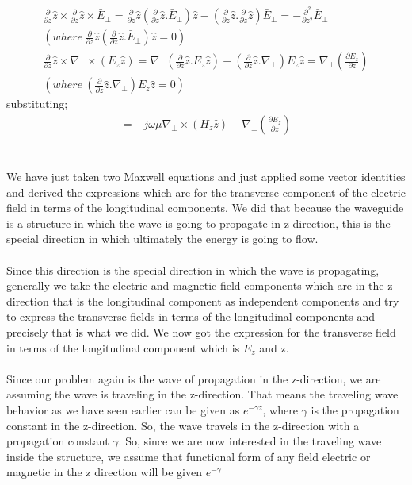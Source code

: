 \begin{align*}
\frac{\partial}{\partial z}\hat{z}\times\frac{\partial}{\partial z}\hat{z}\times\bar{E}_\bot = \frac{\partial}{\partial z}\hat{z}(\frac{\partial}{\partial z}\hat{z}.\bar{E}_\bot)\hat{z} - (\frac{\partial}{\partial z}\hat{z}.\frac{\partial}{\partial z}\hat{z})\bar{E}_\bot = -\frac{\partial^2}{\partial z^2}\bar{E}_\bot\\
(where\ \frac{\partial}{\partial z}\hat{z}(\frac{\partial}{\partial z}\hat{z}.\bar{E}_\bot)\hat{z} = 0)\\
\frac{\partial}{\partial z}\hat{z}\times\nabla_\bot\times(E_z\hat{z}) = \nabla_\bot(\frac{\partial}{\partial z}\hat{z}.E_z\hat{z}) - (\frac{\partial}{\partial z}\hat{z}.\nabla_\bot)E_z\hat{z} = \nabla_\bot(\frac{\partial E_z}{\partial z})\\
(where\ (\frac{\partial}{\partial z}\hat{z}.\nabla_\bot)E_z\hat{z} = 0)
\end{align*}
substituting;
\begin{align}
[\omega^2\mu\epsilon\bar{E}_\bot+\frac{\partial^2}{\partial z^2}\bar{E}_\bot] = -j\omega\mu\nabla_\bot\times(H_z\hat{z}) + \nabla_\bot(\frac{\partial E_z}{\partial z})
\end{align}\\
\\
We have just taken two Maxwell equations and just applied some vector identities and derived the expressions which are for the transverse component of the electric field in terms of the longitudinal components. We did that because the waveguide is a structure in which the wave is going to propagate in z-direction, this is the special direction in which ultimately the energy is going to flow.\\
\\

Since this direction is the special direction in which the wave is propagating, generally we take the electric and magnetic field components which are in the z-direction that is the longitudinal component as independent components and try to express the transverse fields in terms of the longitudinal components and precisely that is what we did. We now got the expression for the transverse field in terms of the longitudinal component which is $E_z$ and z.\\
\\
Since our problem again is the wave of propagation in the z-direction, we are assuming the wave is traveling in the z-direction. That means the traveling wave behavior as we have seen earlier can be given as $e^{-\gamma z}$, where $\gamma$ is the propagation constant in the z-direction. So, the wave travels in the z-direction with a propagation constant $\gamma$. So, since we are now interested in the traveling wave inside the structure, we assume that functional form of any field electric or magnetic in the z direction will be given $e^{-\gamma}$\\

